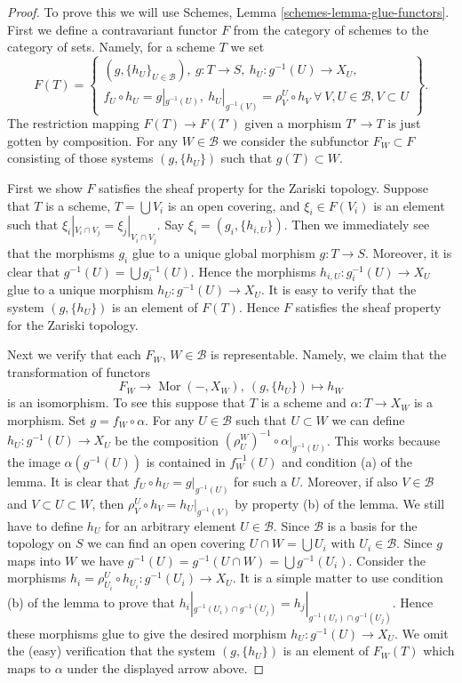 \documentclass{stacks-project}
\theoremstyle{plain}
\theoremstyle{definition}
\theoremstyle{remark}
\numberwithin{equation}{subsection}
\def\Mor{\mathop{\mathrm{Mor}}\nolimits}
\begin{document}
\begin{proof}
To prove this we will use Schemes, Lemma \ref{schemes-lemma-glue-functors}.
First we define a contravariant functor $F$ from the category of schemes
to the category of sets. Namely, for a scheme $T$ we set
$$
F(T) =
\left\{
\begin{matrix}
(g, \{h_U\}_{U \in \mathcal{B}}),
\ g : T \to S, \ h_U : g^{-1}(U) \to X_U, \\
f_U \circ h_U = g|_{g^{-1}(U)},
\ h_U|_{g^{-1}(V)} = \rho^U_V \circ h_V
\ \forall\ V, U \in \mathcal{B}, V \subset U
\end{matrix}
\right\}.
$$
The restriction mapping $F(T) \to F(T')$ given a morphism
$T' \to T$ is just gotten by composition.
For any $W \in \mathcal{B}$ we consider the subfunctor
$F_W \subset F$ consisting of those systems $(g, \{h_U\})$
such that $g(T) \subset W$.

\medskip\noindent
First we show $F$ satisfies the sheaf property for the Zariski topology.
Suppose that $T$ is a scheme, $T = \bigcup V_i$ is an open covering,
and $\xi_i \in F(V_i)$ is an element such that
$\xi_i|_{V_i \cap V_j} = \xi_j|_{V_i \cap V_j}$.
Say $\xi_i = (g_i, \{h_{i, U}\})$. Then we immediately see that
the morphisms $g_i$ glue to a unique global morphism
$g : T \to S$. Moreover, it is clear that
$g^{-1}(U) = \bigcup g_i^{-1}(U)$. Hence the morphisms
$h_{i, U} : g_i^{-1}(U) \to X_U$ glue to a unique morphism
$h_U : g^{-1}(U) \to X_U$. It is easy to verify that the system
$(g, \{h_U\})$ is an element of $F(T)$. Hence $F$ satisfies the
sheaf property for the Zariski topology.

\medskip\noindent
Next we verify that each $F_W$, $W \in \mathcal{B}$ is representable.
Namely, we claim that the transformation of functors
$$
F_W \longrightarrow \Mor(-, X_W), \ (g, \{h_U\}) \longmapsto h_W
$$
is an isomorphism. To see this suppose that $T$ is a scheme and
$\alpha : T \to X_W$ is a morphism. Set $g = f_W \circ \alpha$.
For any $U \in \mathcal{B}$ such that $U \subset W$ we can
define $h_U : g^{-1}(U) \to X_U$ be the composition
$(\rho^W_U)^{-1} \circ \alpha|_{g^{-1}(U)}$. This works because
the image $\alpha(g^{-1}(U))$ is contained in $f_W^{-1}(U)$ and
condition (a) of the lemma. It is clear that
$f_U \circ h_U = g|_{g^{-1}(U)}$ for such a $U$.
Moreover, if also $V \in \mathcal{B}$ and $V \subset U \subset W$,
then $\rho^U_V \circ h_V = h_U|_{g^{-1}(V)}$ by property (b)
of the lemma. We still have to define $h_U$ for an arbitrary
element $U \in \mathcal{B}$. Since $\mathcal{B}$ is a basis for
the topology on $S$ we can find an open covering
$U \cap W = \bigcup U_i$ with $U_i \in \mathcal{B}$. Since $g$ maps into $W$
we have
$g^{-1}(U) = g^{-1}(U \cap W) = \bigcup g^{-1}(U_i)$.
Consider the morphisms
$h_i = \rho^U_{U_i} \circ h_{U_i} : g^{-1}(U_i) \to X_U$.
It is a simple matter to use condition (b) of the lemma
to prove that
$h_i|_{g^{-1}(U_i) \cap g^{-1}(U_j)} = h_j|_{g^{-1}(U_i) \cap g^{-1}(U_j)}$.
Hence these morphisms glue to give the desired morphism
$h_U : g^{-1}(U) \to X_U$. We omit the (easy) verification that
the system $(g, \{h_U\})$ is an element of $F_W(T)$ which
maps to $\alpha$ under the displayed arrow above.


\end{proof}
\end{document}
